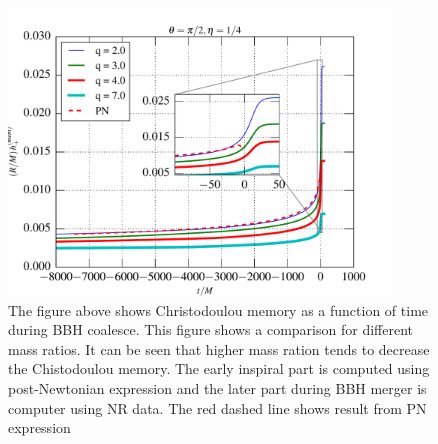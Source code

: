 \documentclass[twocolumn,showpacs,aps,prd,nobibnotes,floatfix]{revtex4-1}
\begin{document}
\begin{figure}
 	\includegraphics[width=4.0in]{../plots/MemoryPlot_nonSpining/q7.pdf}
 	\caption{The figure above shows Christodoulou memory as a function of time during BBH coalesce. This figure shows a comparison for different mass ratios. It can be seen that higher mass ration tends to decrease the Chistodoulou memory. The early inspiral part is computed using post-Newtonian expression and the later part during BBH merger is computer using NR data. The red dashed line shows result from PN expression}
 	\label{fig:differentmassratio}
\end{figure}
\end{document}
